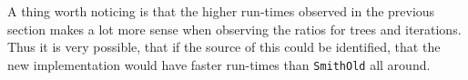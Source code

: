 A thing worth noticing is that the higher run-times observed in the previous
section makes a lot more sense when observing the ratios for trees and iterations.
Thus it is very possible, that if the source of this could be identified, that
the new implementation would have faster run-times than \texttt{SmithOld} all around.

